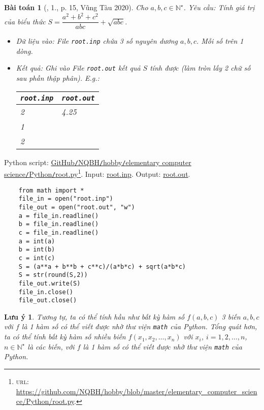 \documentclass{article}
\newtheorem{baitoan}{Bài toán}
\newtheorem{luuy}{Lưu ý}
\begin{document}
\begin{baitoan}[\cite{VietSTEM2021}, 1., p. 15, Vũng Tàu 2020]
	Cho $a,b,c\in\mathbb{N}^\star$. {\sf Yêu cầu:} Tính giá trị của biểu thức $S = \dfrac{a^2 + b^2 + c^2}{abc} + \sqrt{abc}$.
	\begin{itemize}
		\item {\sf Dữ liệu vào:} File \verb|root.inp| chứa 3 số nguyên dương $a,b,c$. Mỗi số trên 1 dòng.
		\item {\sf Kết quả:} Ghi vào File \verb|root.out| kết quả $S$ tính được (làm tròn lấy 2 chữ số sau phần thập phân). E.g.:
		\begin{table}[H]
			\centering
			\begin{tabular}{|l|l|}
				\hline
				\texttt{root.inp} & \texttt{root.out} \\
				\hline
				2 & 4.25 \\
				1 &  \\
				2 &  \\
				\hline
			\end{tabular}
		\end{table}
	\end{itemize}
\end{baitoan}
Python script: \href{https://github.com/NQBH/hobby/blob/master/elementary_computer_science/Python/root.py}{GitHub\texttt{/}NQBH\texttt{/}hobby\texttt{/}elementary computer science\texttt{/}Python\texttt{/}root.py}\footnote{\textsc{url}: \url{https://github.com/NQBH/hobby/blob/master/elementary_computer_science/Python/root.py}.}. Input: \href{https://github.com/NQBH/hobby/blob/master/elementary_computer_science/Python/root.inp}{root.inp}. Output: \href{https://github.com/NQBH/hobby/blob/master/elementary_computer_science/Python/root.out}{root.out}.
\begin{verbatim}
	from math import *
	file_in = open("root.inp")
	file_out = open("root.out", "w")
	a = file_in.readline()
	b = file_in.readline()
	c = file_in.readline()
	a = int(a)
	b = int(b)
	c = int(c)
	S = (a**a + b**b + c**c)/(a*b*c) + sqrt(a*b*c)
	S = str(round(S,2))
	file_out.write(S)
	file_in.close()
	file_out.close()
\end{verbatim}

\begin{luuy}
	Tương tự, ta có thể tính hầu như bất kỳ hàm số $f(a,b,c)$ 3 biến $a,b,c$ với $f$ là 1 hàm số có thể viết được nhờ thư viện \texttt{math} của Python. Tổng quát hơn, ta có thể tính bất kỳ hàm số nhiều biến $f(x_1,x_2,\ldots,x_n)$ với $x_i$, $i = 1,2,\ldots,n$, $n\in\mathbb{N}^\star$ là các biến, với $f$ là 1 hàm số có thể viết được nhờ thư viện \texttt{math} của Python.
\end{luuy}
\end{document}
